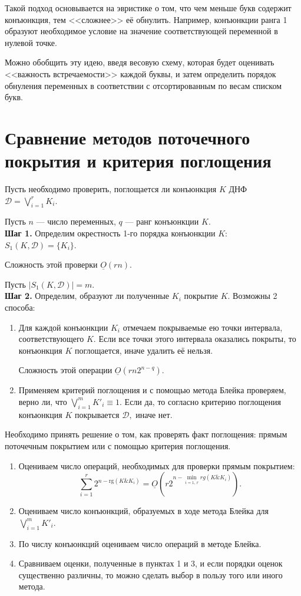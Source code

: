 \documentclass[12pt,a4paper,oneside,fleqn,leqno]{article}
\theoremstyle{definition}
\begin{document}
		Такой подход основывается на эвристике о том, что чем меньше букв содержит конъюнкция, тем <<сложнее>> её обнулить. Например, конъюнкции ранга 1 образуют необходимое условие на значение соответствующей переменной в нулевой точке.\par
		Можно обобщить эту идею, введя весовую схему, которая будет оценивать <<важность встречаемости>> каждой буквы, и затем определить порядок обнуления переменных в соответствии с отсортированным по весам списком букв.\par

	\section{Сравнение методов поточечного покрытия и критерия поглощения}
		Пусть необходимо проверить, поглощается ли конъюнкция $K$ ДНФ $\mathcal{D} = \bigvee\limits_{i = 1}^r K_i.$\par
		Пусть $n$ --- число переменных, $q$ --- ранг конъюнкции $K.$\\
		\textbf{Шаг 1.} Определим окрестность 1-го порядка конъюнкции $K$: $S_1(K, \mathcal{D}) = \{K_i\}.$\par
		Сложность этой проверки $\underline{O}(rn).$\par
		Пусть $|S_1(K, \mathcal{D})| = m$.\\
		\textbf{Шаг 2.} Определим, образуют ли полученные $K_i$ покрытие $K.$ Возможны 2 способа:\par
		\begin{enumerate}
			\item
			Для каждой конъюнкции $K_i$ отмечаем покрываемые ею точки интервала, соответствующего $K.$ Если все точки этого интервала оказались покрыты, то конъюнкция $K$ поглощается, иначе удалить её нельзя.\par
			Сложность этой операции $\underline{O}(rn2^{n-q})$.
			\item
			Применяем критерий поглощения и с помощью метода Блейка проверяем, верно ли, что $\bigvee\limits_{i = 1}^m K'_i \equiv 1.$ Если да, то согласно критерию поглощения конъюнкция $K$ покрывается $\mathcal{D},$ иначе нет.\par
		\end{enumerate}\par
		Необходимо принять решение о том, как проверять факт поглощения: прямым поточечным покрытием или с помощью критерия поглощения.
		\begin{enumerate}
			\item
			Оцениваем число операций, необходимых для проверки прямым покрытием:
			$$
				\sum_{i = 1}^r 2^{n-\text{rg}(K \& K_i)} = \underline{O}\left(r 2^{n - \min\limits_{i = \overline{1,\,r}}rg(K \& K_i)}\right).
			$$
			\item
			Оцениваем число конъюнкций, образуемых в ходе метода Блейка для $\bigvee\limits_{i = 1}^m K'_i$.
			\item
			По числу конъюнкций оцениваем число операций в методе Блейка.
			\item
			Сравниваем оценки, полученные в пунктах 1 и 3, и если порядки оценок существенно различны, то можно сделать выбор в пользу того или иного метода.
		\end{enumerate}
\end{document}
